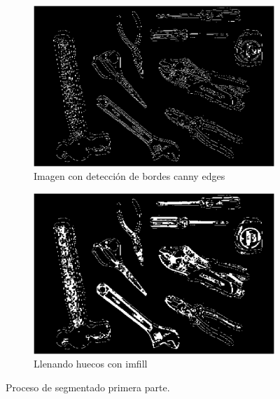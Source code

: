 \documentclass[a4paper, 11pt]{article}
\begin{document}
\begin{figure}[h]
  \begin{subfigure}{0.5\linewidth}
    \includegraphics[width=\linewidth]{paso3}
    \caption{Imagen con detección de bordes canny edges}
    \label{fig:1a}
  \end{subfigure}\hfill
  \begin{subfigure}{0.5\linewidth}
    \includegraphics[width=\linewidth]{paso4}
    \caption{Llenando huecos con imfill}
    \label{fig:1a}
  \end{subfigure}
  \caption{Proceso de segmentado primera parte.}
  \label{fig:1}
\end{figure}
\end{document}
